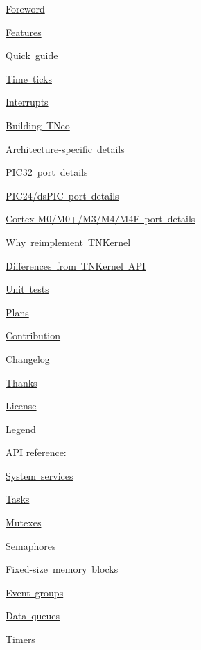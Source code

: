 \begin{DoxyItemize}
\item \mbox{\hyperlink{foreword}{Foreword}}
\item \mbox{\hyperlink{features}{Features}}
\item \mbox{\hyperlink{quick_guide}{Quick guide}}
\item \mbox{\hyperlink{time_ticks}{Time ticks}}
\item \mbox{\hyperlink{interrupts}{Interrupts}}
\item \mbox{\hyperlink{building}{Building T\+Neo}}
\item \mbox{\hyperlink{arch_specific}{Architecture-\/specific details}}
\begin{DoxyItemize}
\item \mbox{\hyperlink{arch_specific_pic32_details}{P\+I\+C32 port details}}
\item \mbox{\hyperlink{arch_specific_pic24_details}{P\+I\+C24/ds\+P\+IC port details}}
\item \mbox{\hyperlink{arch_specific_cortex_m_details}{Cortex-\/\+M0/\+M0+/\+M3/\+M4/\+M4F port details}}
\end{DoxyItemize}
\item \mbox{\hyperlink{why_reimplement}{Why reimplement T\+N\+Kernel}}
\item \mbox{\hyperlink{tnkernel_diff}{Differences from T\+N\+Kernel A\+PI}}
\item \mbox{\hyperlink{unit_tests}{Unit tests}}
\item \mbox{\hyperlink{plans}{Plans}}
\item \mbox{\hyperlink{contribution}{Contribution}}
\item \mbox{\hyperlink{changelog}{Changelog}}
\item \mbox{\hyperlink{thanks}{Thanks}}
\item \mbox{\hyperlink{license}{License}}
\item \mbox{\hyperlink{legend}{Legend}}
\end{DoxyItemize}

A\+PI reference\+:


\begin{DoxyItemize}
\item \mbox{\hyperlink{tn__sys_8h}{System services}}
\item \mbox{\hyperlink{tn__tasks_8h}{Tasks}}
\item \mbox{\hyperlink{tn__mutex_8h}{Mutexes}}
\item \mbox{\hyperlink{tn__sem_8h}{Semaphores}}
\item \mbox{\hyperlink{tn__fmem_8h}{Fixed-\/size memory blocks}}
\item \mbox{\hyperlink{tn__eventgrp_8h}{Event groups}}
\item \mbox{\hyperlink{tn__dqueue_8h}{Data queues}}
\item \mbox{\hyperlink{tn__timer_8h}{Timers}} 
\end{DoxyItemize}